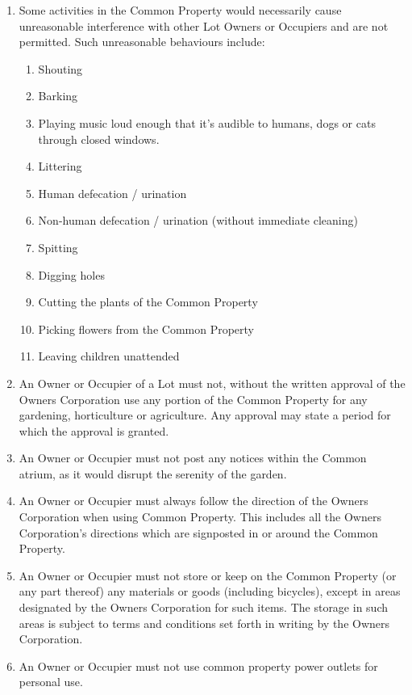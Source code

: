 \documentclass{article}
\begin{document}
\begin{enumerate}[label=\arabic*.]
\begin{enumerate}[label=\arabic{enumi}.\arabic*.]
\begin{enumerate}[label=(\arabic*)]
\item Some activities in the Common Property would necessarily cause unreasonable interference with other Lot Owners or Occupiers and are not permitted. Such unreasonable behaviours include:
\begin{enumerate}[label=(\alph*)]
    \item Shouting
    \item Barking
    \item Playing music loud enough that it's audible to humans, dogs or cats through closed windows.
    \item Littering
    \item Human defecation / urination
    \item Non-human defecation / urination (without immediate cleaning)
    \item Spitting
    \item Digging holes
    \item Cutting the plants of the Common Property
    \item Picking flowers from the Common Property
    \item Leaving children unattended
\end{enumerate}

\item  An Owner or Occupier of a Lot must not, without the written approval of the Owners Corporation use any portion of the Common Property for any gardening, horticulture or agriculture. Any approval may state a period for which the approval is granted.

\item  An Owner or Occupier must not post any notices within the Common atrium, as it would disrupt the serenity of the garden.

\item  An Owner or Occupier must always follow the direction of the Owners Corporation when using Common Property. This includes all the Owners Corporation's directions which are signposted in or around the Common Property.

\item  An Owner or Occupier must not store or keep on the Common Property (or any part thereof) any materials or goods (including bicycles), except in areas designated by the Owners Corporation for such items. The storage in such areas is subject to terms and conditions set forth in writing by the Owners Corporation.

\item  An Owner or Occupier must not use common property power outlets for personal use.


\end{enumerate}
\end{enumerate}
\end{enumerate}
\end{document}
